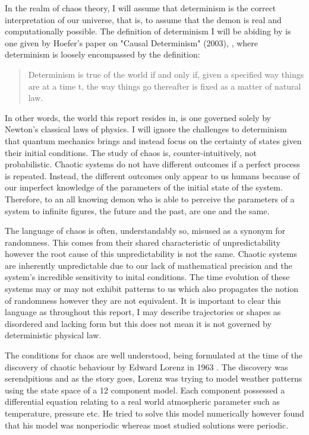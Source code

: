 \documentclass[aps,prl,reprint,10pt,amsmath,amssymb,superscriptaddress,a4paper]{revtex4-2}
\begin{document}
In the realm of chaos theory, I will assume that determinism is the correct interpretation of our universe, that is, 
to assume that the demon is real and computationally possible. The definition of determinism I will 
be abiding by is one given by Hoefer's paper on "Causal Determinism" (2003), \citep{sep-determinism-causal}, where 
determinism is loosely encompassed by the definition: 

\begin{quote}
    Determinism is true of the world if and only if, given a specified way things are at a time t, the way things go 
    thereafter is fixed as a matter of natural law.
\end{quote}

In other words, the world this report resides in, is one governed solely by Newton's classical laws of physics. I will 
ignore the challenges to determinism that quantum mechanics brings \citep{earman} and instead focus on the certainty of states given 
their initial conditions. The study of chaos is, counter-intuitively, not probabilistic. Chaotic systems do not have 
different outcomes if a perfect process is repeated. Instead, the different outcomes only appear to us humans because 
of our imperfect knowledge of the parameters of the initial state of the system. Therefore, to an all knowing demon 
who is able to perceive the parameters of a system to infinite figures, the future and the past, are one and the same.

The language of chaos is often, understandably so, misused as a synonym for randomness. This comes from their shared 
characteristic of unpredictability however the root cause of this unpredictability is not the same. Chaotic systems are 
inherently unpredictable due to our lack of mathematical precision and the system's incredible sensitivity to inital 
conditions. The time evolution of these systems may or may not exhibit patterns to us which also propagates the notion of 
randomness however they are not equivalent. It is important to clear this language as throughout this report, I may describe 
trajectories or shapes as disordered and lacking form but this does not mean it is not governed by deterministic physical law.

The conditions for chaos are well understood, being formulated at the time of the discovery of chaotic behaviour by Edward Lorenz 
in 1963 \citep{lorenz}. The discovery was serendpitious and as the story goes, Lorenz was trying to model weather patterns using 
the state space of a 12 component model. Each component possessed a differential equation relating to a real world atmospheric 
parameter such as temperature, pressure etc. He tried to solve this model numerically however found that his model was nonperiodic 
whereas most studied solutions were periodic.
\end{document}

